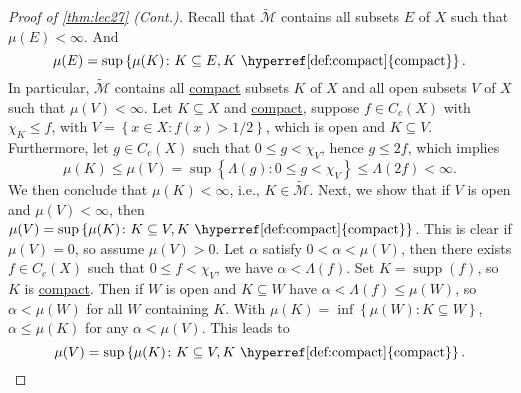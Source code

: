 \begin{proof}[Proof of \autoref{thm:lec27} (Cont.)]
	Recall that \(\widetilde{\mathcal{M}}\) contains all subsets \(E\) of \(X\) such that \(\mu (E) < \infty \). And
	\[
		\mu (E) = \sup \left\{ \mu (K)\colon K\subseteq E, K \text{ \hyperref[def:compact]{compact}} \right\}.
	\]
	In particular, \( \widetilde{\mathcal{M}} \) contains all \hyperref[def:compact]{compact} subsets \(K\) of \(X\) and all open subsets \(V\) of \(X\) such that \(\mu (V) < \infty \). Let \(K \subseteq X\) and \hyperref[def:compact]{compact}, suppose \(f\in C_c(X)\) with \(\chi _K \leq f\), with \(V = \left\{ x\in X\colon f(x) > 1 / 2 \right\} \), which is open and \(K \subseteq V\). Furthermore, let \(g\in C_c(X)\) such that \(0 \leq g < \chi _V\), hence \(g \leq 2f\), which implies
	\[
		\mu (K) \leq \mu (V) = \sup \left\{ \Lambda (g) \colon 0 \leq g < \chi _V \right\} \leq \Lambda (2f) < \infty.
	\]
	We then conclude that \(\mu (K) < \infty \), i.e., \(K\in \widetilde{\mathcal{M}} \). Next, we show that if \(V\) is open and \(\mu (V) < \infty \), then \(\mu (V) = \sup \left\{ \mu(K)\colon K \subseteq V, K \text{ \hyperref[def:compact]{compact}} \right\} \). This is clear if \(\mu (V) = 0\), so assume \(\mu (V) > 0\). Let \(\alpha \) satisfy \(0 < \alpha < \mu (V)\), then there exists \(f\in C_c(X)\) such that \(0 \leq f < \chi _V\), we have \(\alpha < \Lambda (f)\). Set \(K = \mathop{\mathrm{supp}}(f) \), so \(K\) is \hyperref[def:compact]{compact}. Then if \(W\) is open and \(K \subseteq W\) have \(\alpha < \Lambda (f) \leq \mu (W)\), so \(\alpha < \mu (W)\) for all \(W\) containing \(K\). With \(\mu (K) = \inf \left\{ \mu (W) \colon K \subseteq W \right\} \), \(\alpha \leq \mu (K)\) for any \(\alpha < \mu (V)\). This leads to
	\[
		\mu (V) = \sup \left\{ \mu (K) \colon K \subseteq V, K \text{ \hyperref[def:compact]{compact}} \right\}.
	\]


\end{proof}
